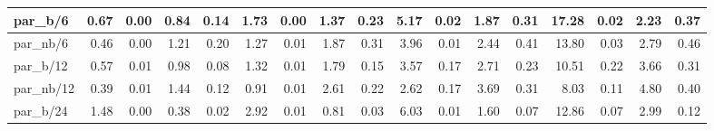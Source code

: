 \begin{tabular}{|lllllllllllllllll|}
\multicolumn{1}{|l|}{par\_b/6}  & \multicolumn{1}{r|}{0.67} & \multicolumn{1}{r|}{0.00} & \multicolumn{1}{r|}{0.84} & \multicolumn{1}{r|}{0.14}  & \multicolumn{1}{r|}{1.73} & \multicolumn{1}{r|}{0.00} & \multicolumn{1}{r|}{1.37} & \multicolumn{1}{r|}{0.23}  & \multicolumn{1}{r|}{5.17} & \multicolumn{1}{r|}{0.02} & \multicolumn{1}{r|}{1.87} & \multicolumn{1}{r|}{0.31}  & \multicolumn{1}{r|}{17.28} & \multicolumn{1}{r|}{0.02} & \multicolumn{1}{r|}{2.23} & \multicolumn{1}{r|}{0.37}  \\ \hline
\multicolumn{1}{|l|}{par\_nb/6}  & \multicolumn{1}{r|}{0.46} & \multicolumn{1}{r|}{0.00} & \multicolumn{1}{r|}{1.21} & \multicolumn{1}{r|}{0.20}  & \multicolumn{1}{r|}{1.27} & \multicolumn{1}{r|}{0.01} & \multicolumn{1}{r|}{1.87} & \multicolumn{1}{r|}{0.31}  & \multicolumn{1}{r|}{3.96} & \multicolumn{1}{r|}{0.01} & \multicolumn{1}{r|}{2.44} & \multicolumn{1}{r|}{0.41}  & \multicolumn{1}{r|}{13.80} & \multicolumn{1}{r|}{0.03} & \multicolumn{1}{r|}{2.79} & \multicolumn{1}{r|}{0.46}  \\ \hline
\multicolumn{1}{|l|}{par\_b/12}  & \multicolumn{1}{r|}{0.57} & \multicolumn{1}{r|}{0.01} & \multicolumn{1}{r|}{0.98} & \multicolumn{1}{r|}{0.08}  & \multicolumn{1}{r|}{1.32} & \multicolumn{1}{r|}{0.01} & \multicolumn{1}{r|}{1.79} & \multicolumn{1}{r|}{0.15}  & \multicolumn{1}{r|}{3.57} & \multicolumn{1}{r|}{0.17} & \multicolumn{1}{r|}{2.71} & \multicolumn{1}{r|}{0.23}  & \multicolumn{1}{r|}{10.51} & \multicolumn{1}{r|}{0.22} & \multicolumn{1}{r|}{3.66} & \multicolumn{1}{r|}{0.31}  \\ \hline
\multicolumn{1}{|l|}{par\_nb/12}  & \multicolumn{1}{r|}{0.39} & \multicolumn{1}{r|}{0.01} & \multicolumn{1}{r|}{1.44} & \multicolumn{1}{r|}{0.12}  & \multicolumn{1}{r|}{0.91} & \multicolumn{1}{r|}{0.01} & \multicolumn{1}{r|}{2.61} & \multicolumn{1}{r|}{0.22}  & \multicolumn{1}{r|}{2.62} & \multicolumn{1}{r|}{0.17} & \multicolumn{1}{r|}{3.69} & \multicolumn{1}{r|}{0.31}  & \multicolumn{1}{r|}{8.03} & \multicolumn{1}{r|}{0.11} & \multicolumn{1}{r|}{4.80} & \multicolumn{1}{r|}{0.40}  \\ \hline
\multicolumn{1}{|l|}{par\_b/24}  & \multicolumn{1}{r|}{1.48} & \multicolumn{1}{r|}{0.00} & \multicolumn{1}{r|}{0.38} & \multicolumn{1}{r|}{0.02}  & \multicolumn{1}{r|}{2.92} & \multicolumn{1}{r|}{0.01} & \multicolumn{1}{r|}{0.81} & \multicolumn{1}{r|}{0.03}  & \multicolumn{1}{r|}{6.03} & \multicolumn{1}{r|}{0.01} & \multicolumn{1}{r|}{1.60} & \multicolumn{1}{r|}{0.07}  & \multicolumn{1}{r|}{12.86} & \multicolumn{1}{r|}{0.07} & \multicolumn{1}{r|}{2.99} & \multicolumn{1}{r|}{0.12}  \\ \hline

\end{tabular}
